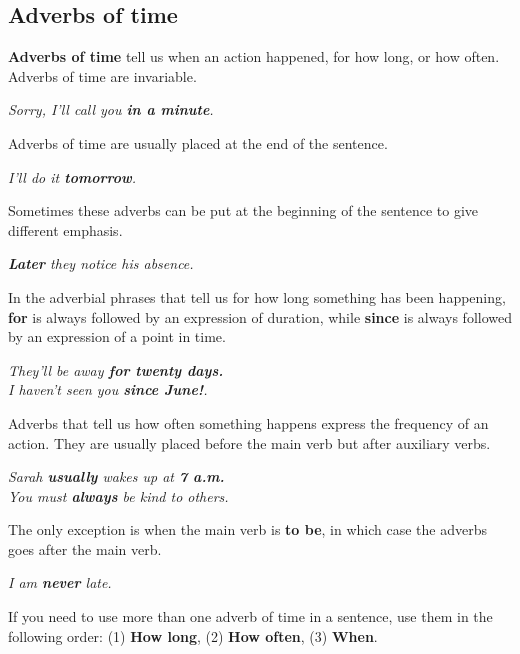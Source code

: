 \documentclass[hidelinks,10pt,a4paper]{article}
\begin{document}
\subsection{Adverbs of time}
\textbf{Adverbs of time} tell us when an action happened, for how long, or how often.
Adverbs of time are invariable.

\begin{center}
	\textit{Sorry, I'll call you \textbf{in a minute}.}
\end{center}

Adverbs of time are usually placed at the end of the sentence.

\begin{center}
	\textit{I'll do it \textbf{tomorrow}.}
\end{center}

Sometimes these adverbs can be put at the beginning of the sentence to give different emphasis.

\begin{center}
	\textit{\textbf{Later} they notice his absence.}
\end{center}

In the adverbial phrases that tell us for how long something has been happening, \textbf{for} is always followed by an expression of duration, while \textbf{since} is always followed by an expression of a point in time.

\begin{center}
	\textit{They'll be away \textbf{for twenty days.}}\\
	\textit{I haven't seen you \textbf{since June!}.}
\end{center}

Adverbs that tell us how often something happens express the frequency of an action. They are usually placed before the main verb but after auxiliary verbs.

\begin{center}
	\textit{Sarah \textbf{usually} wakes up at \textbf{7 a.m.}\\
	You must \textbf{always} be kind to others.}
\end{center}

The only exception is when the main verb is \textbf{to be}, in which case the adverbs goes after the main verb.

\begin{center}
	\textit{I am \textbf{never} late.}
\end{center}

If you need to use more than one adverb of time in a sentence, use them in the following order: (1) \textbf{How long}, (2) \textbf{How often}, (3) \textbf{When}.
\end{document}
